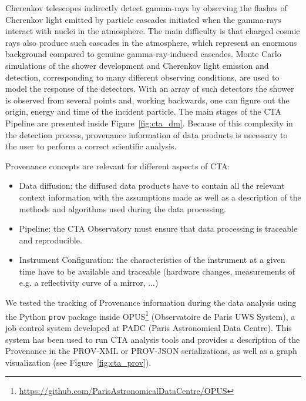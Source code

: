 Cherenkov telescopes indirectly detect gamma-rays by observing the flashes of Cherenkov light emitted by particle cascades initiated when the gamma-rays interact with nuclei in the atmosphere. The main difficulty  is that charged cosmic rays also produce such cascades in the atmosphere, which represent an enormous background compared to genuine gamma-ray-induced cascades. Monte Carlo simulations of the shower development and Cherenkov light emission and detection, corresponding to many different observing conditions, are used to model the response of the detectors.  With an array of such detectors the shower is observed  from several points and, working backwards, one can figure out the origin, energy and time of the incident particle. The main stages of the CTA Pipeline are presented inside Figure~\ref{fig:cta_dm}. Because of this complexity in the detection process, provenance information of data products is necessary to the user to perform a correct scientific analysis.

Provenance concepts are relevant for different aspects of CTA:
\begin{itemize}
\item Data diffusion: the diffused data products have to contain all the relevant context information with the assumptions made as well as a description of the methods and algorithms used during the data processing.
\item Pipeline: the CTA Observatory must ensure that data processing is traceable and reproducible.
\item Instrument Configuration: the characteristics of the instrument at a given time have to be available and traceable (hardware changes, measurements of e.g. a reflectivity curve of a mirror, ...)
\end{itemize}

We tested the tracking of Provenance information during the data analysis using the Python \texttt{prov} package inside OPUS\footnote{\url{https://github.com/ParisAstronomicalDataCentre/OPUS}} (Observatoire de Paris UWS System), a job control system developed at PADC (Paris Astronomical Data Centre). This system has been used to run CTA analysis tools and provides a description of the Provenance in the PROV-XML or PROV-JSON serializations, as well as a graph visualization (see Figure~\ref{fig:cta_prov}).

